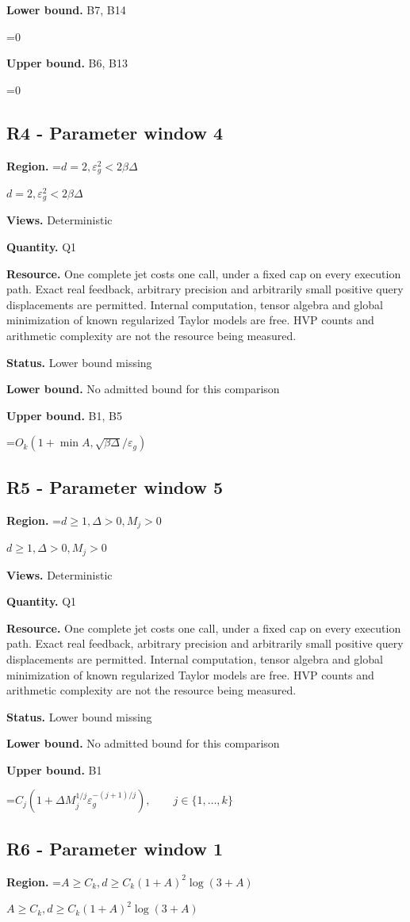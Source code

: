\documentclass[10pt,a4paper]{article}
\newcommand{\AtlasMath}[1]{\par\begingroup\centering\setbox0=\hbox{$\displaystyle #1$}\ifdim\wd0>1.4\linewidth\typeout{ATLAS WIDE FORMULA: \the\wd0}\fi\ifdim\wd0>\linewidth\resizebox{\linewidth}{!}{\box0}\else\box0\fi\par\endgroup}
\newcommand{\AtlasInlineMath}[1]{\begingroup\setbox0=\hbox{$#1$}\ifdim\wd0>.4\linewidth\endgroup\AtlasMath{#1}\else\endgroup$#1$\fi}
\begin{document}
\textbf{Lower bound.} B7, B14

\AtlasMath{0}
\textbf{Upper bound.} B6, B13

\AtlasMath{0}
\subsection{R4 - Parameter window 4}
\textbf{Region.} \AtlasInlineMath{d=2, \varepsilon_g^2<2\beta\Delta}

\textbf{Views.} Deterministic

\textbf{Quantity.} Q1

\textbf{Resource.} One complete jet costs one call, under a fixed cap on every execution path. Exact real feedback, arbitrary precision and arbitrarily small positive query displacements are permitted. Internal computation, tensor algebra and global minimization of known regularized Taylor models are free. HVP counts and arithmetic complexity are not the resource being measured.

\textbf{Status.} Lower bound missing

\textbf{Lower bound.} No admitted bound for this comparison

\textbf{Upper bound.} B1, B5

\AtlasMath{O_k(1+\min{A,\sqrt{\beta\Delta}/\varepsilon_g})}
\subsection{R5 - Parameter window 5}
\textbf{Region.} \AtlasInlineMath{d\ge 1, \Delta>0, M_j>0}

\textbf{Views.} Deterministic

\textbf{Quantity.} Q1

\textbf{Resource.} One complete jet costs one call, under a fixed cap on every execution path. Exact real feedback, arbitrary precision and arbitrarily small positive query displacements are permitted. Internal computation, tensor algebra and global minimization of known regularized Taylor models are free. HVP counts and arithmetic complexity are not the resource being measured.

\textbf{Status.} Lower bound missing

\textbf{Lower bound.} No admitted bound for this comparison

\textbf{Upper bound.} B1

\AtlasMath{C_j(1+\Delta M_j^{1/j}\varepsilon_g^{-(j+1)/j}),\qquad j\in\{1,\ldots,k\}}
\subsection{R6 - Parameter window 1}
\textbf{Region.} \AtlasInlineMath{A\ge C_k, d\ge C_k(1+A)^2 \log(3+A)}
\end{document}
